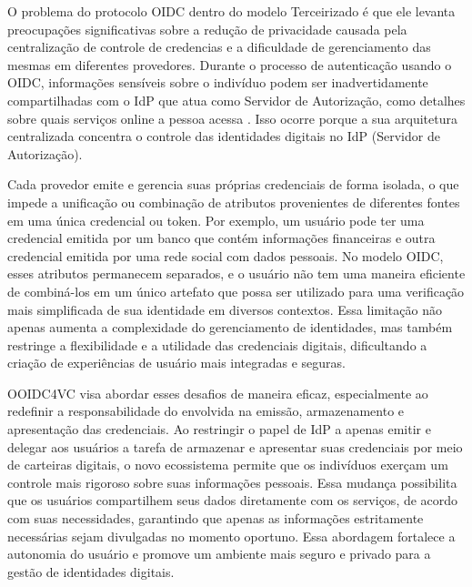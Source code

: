 O problema do protocolo \acs{OIDC} dentro do modelo Terceirizado é que ele levanta preocupações significativas sobre a redução de privacidade causada pela centralização de controle de credencias e a dificuldade de gerenciamento das mesmas em diferentes provedores. Durante o processo de autenticação usando o \acs{OIDC}, informações sensíveis sobre o indivíduo podem ser inadvertidamente compartilhadas com o \acs{IdP} que atua como Servidor de Autorização, como detalhes sobre quais serviços online a pessoa acessa \cite[Página 7]{OIDC4VCWhitepaper2022}. Isso ocorre porque a sua arquitetura centralizada concentra o controle das identidades digitais no \acs{IdP} (Servidor de Autorização).

Cada provedor emite e gerencia suas próprias credenciais de forma isolada, o que impede a unificação ou combinação de atributos provenientes de diferentes fontes em uma única credencial ou token. Por exemplo, um usuário pode ter uma credencial emitida por um banco que contém informações financeiras e outra credencial emitida por uma rede social com dados pessoais. No modelo \acs{OIDC}, esses atributos permanecem separados, e o usuário não tem uma maneira eficiente de combiná-los em um único artefato que possa ser utilizado para uma verificação mais simplificada de sua identidade em diversos contextos. Essa limitação não apenas aumenta a complexidade do gerenciamento de identidades, mas também restringe a flexibilidade e a utilidade das credenciais digitais, dificultando a criação de experiências de usuário mais integradas e seguras.

O\acs{OIDC4VC} visa abordar esses desafios de maneira eficaz, especialmente ao redefinir a responsabilidade do envolvida na emissão, armazenamento e apresentação das credenciais. Ao restringir o papel de \acs{IdP} a apenas emitir e delegar aos usuários a tarefa de armazenar e apresentar suas credenciais por meio de carteiras digitais, o novo ecossistema permite que os indivíduos exerçam um controle mais rigoroso sobre suas informações pessoais. Essa mudança possibilita que os usuários compartilhem seus dados diretamente com os serviços, de acordo com suas necessidades, garantindo que apenas as informações estritamente necessárias sejam divulgadas no momento oportuno. Essa abordagem fortalece a autonomia do usuário e promove um ambiente mais seguro e privado para a gestão de identidades digitais.

